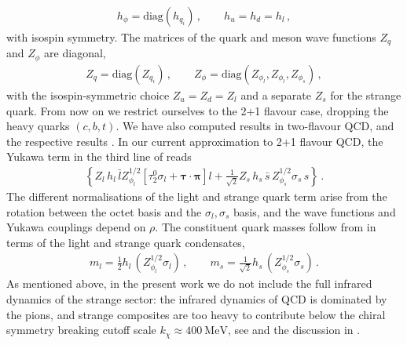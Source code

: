 \documentclass[aps,twocolumn,prd,superscriptaddress]{revtex4-2}
\begin{document}
%
\begin{align}
	h_\phi =\textrm{diag}\left( h_{q_i}\right)\,, \qquad  h_u=h_d=h_l\,,
	\label{eq:hphi}
\end{align}
%
with isospin symmetry. The matrices of the quark and meson wave functions $Z_q$ and $Z_\phi$ are diagonal, 
%
\begin{align}
	Z_q =\textrm{diag}\left( Z_{q_i}\right)\,, \qquad Z_\phi= \textrm{diag}\left( Z_{\phi_l},  Z_{\phi_l}, Z_{\phi_s}\right)\,,
\end{align}
%
with the isospin-symmetric choice $ Z_u=Z_d=Z_l$ and a separate $Z_s$ for the strange quark. From now on we restrict ourselves to the 2+1 flavour case, dropping the heavy quarks $(c,b,t)$. We have also computed results in two-flavour QCD, and the respective results . In our current approximation to 2+1 flavour QCD, the Yukawa term in the third line of  reads 
%
\begin{align}
 \left\{ Z_l \, h_l \,\bar l Z_{\phi_l}^{1/2}  \left[\tau^0_2 \sigma_l + \bm{\tau} \cdot \bm \pi\right] l +  \frac{1}{\sqrt{2}} Z_s\, h_s\,\bar s  \,Z_{\phi_s}^{1/2} \sigma_s \,s\right\} \,.  
		\label{eq:ExplicitYukTerm}
\end{align}
%
The different normalisations of the light and strange quark term arise from the rotation  between the octet basis and the $\sigma_l,\sigma_s$ basis, and the wave functions and Yukawa couplings depend on $\rho$. The constituent quark masses follow from  in terms of the light and strange quark condensates, 
%
\begin{align}
	m_l= \frac{1}{2} h_l \,\left( Z_{\phi_l}^{1/2} \sigma_l\right) \, , \quad\quad m_s =\frac{1}{\sqrt{2}} h_s \, \left( Z_{\phi_s}^{1/2}\sigma_s\right) 
	\, .
	\label{eq:constituent_masses}
\end{align}
%
As mentioned above, in the present work we do not include the full infrared dynamics of the strange sector: the infrared dynamics of QCD is dominated by the pions, and strange composites are too heavy to contribute below the chiral symmetry breaking cutoff scale $k_\chi \approx \qty{400}{\MeV}$, see  and the discussion in . 
\end{document}
